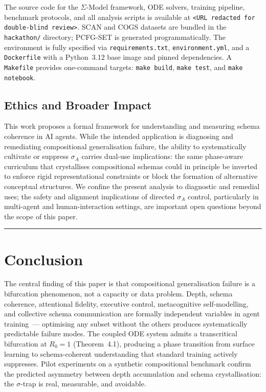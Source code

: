 \documentclass[10pt]{article}
\begin{document}
The source code for the $\Sigma$-Model framework, ODE solvers, training pipeline, benchmark protocols, and all analysis scripts is available at \texttt{<URL redacted for double-blind review>}. SCAN and COGS datasets are bundled in the \texttt{hackathon/} directory; PCFG-SET is generated programmatically. The environment is fully specified via \texttt{requirements.txt}, \texttt{environment.yml}, and a \texttt{Dockerfile} with a Python~3.12 base image and pinned dependencies. A \texttt{Makefile} provides one-command targets: \texttt{make build}, \texttt{make test}, and \texttt{make notebook}.

\subsection*{Ethics and Broader Impact}

This work proposes a formal framework for understanding and measuring schema coherence in AI agents. While the intended application is diagnosing and remediating compositional generalisation failure, the ability to systematically cultivate or suppress $\sigma_A$ carries dual-use implications: the same phase-aware curriculum that crystallises compositional schemas could in principle be inverted to enforce rigid representational constraints or block the formation of alternative conceptual structures. We confine the present analysis to diagnostic and remedial uses; the safety and alignment implications of directed $\sigma_A$ control, particularly in multi-agent and human-interaction settings, are important open questions beyond the scope of this paper.

\noindent\rule{\linewidth}{0.4pt}

\section{Conclusion}\label{sec:conclusion}

The central finding of this paper is that compositional generalisation
failure is a bifurcation phenomenon, not a capacity or data problem.
Depth, schema coherence, attentional fidelity, executive control,
metacognitive self-modelling, and collective schema communication are
formally independent variables in agent training~--- optimising any
subset without the others produces systematically predictable failure
modes. The coupled ODE system admits a transcritical bifurcation at
$R_0 = 1$ (Theorem~4.1), producing a phase transition from surface
learning to schema-coherent understanding that standard training
actively suppresses. Pilot experiments on a synthetic compositional
benchmark confirm the predicted asymmetry between depth accumulation
and schema crystallisation: the $\sigma$-trap is real, measurable,
and avoidable.
\end{document}
